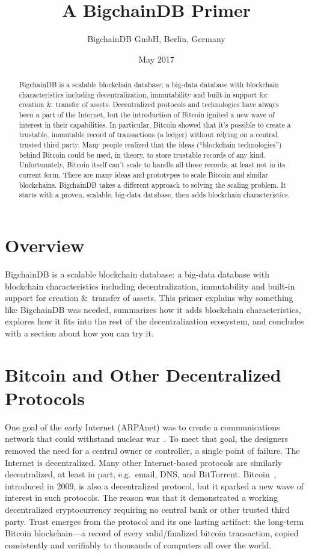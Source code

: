 \documentclass[a4paper]{article}
\title{A BigchainDB Primer}
\author{BigchainDB GmbH, Berlin, Germany}
\date{May 2017}
\begin{document}
\maketitle

\begin{abstract}
BigchainDB is a scalable blockchain database:
a big-data database with blockchain characteristics
including decentralization, immutability and
built-in support for creation \&~transfer of assets.
Decentralized protocols and technologies have always been a part of the Internet,
but the introduction of Bitcoin ignited a new wave of interest in their capabilities.
In particular, Bitcoin showed that it's possible to create a trustable, immutable
record of transactions (a ledger) without relying on a central, trusted third party.
Many people realized that the ideas (``blockchain technologies'') behind Bitcoin
could be used, in theory, to store trustable records of any kind.
Unfortunately, Bitcoin itself can't scale to handle all those records,
at least not in its current form.
There are many ideas and prototypes to scale Bitcoin and similar blockchains.
BigchainDB takes a different approach to solving the scaling problem.
It starts with a proven, scalable, big-data database,
then adds blockchain characteristics.
\end{abstract}


\section{Overview}

BigchainDB is a scalable blockchain database:
a big-data database with blockchain characteristics
including decentralization, immutability and
built-in support for creation \&~transfer of assets.
This primer explains why something like BigchainDB was needed,
summarizes how it adds blockchain characteristics,
explores how it fits into the rest of the decentralization ecosystem,
and concludes with a section about how you can try it.


\section{Bitcoin and Other Decentralized Protocols}

One goal of the early Internet (ARPAnet) was to create a communications network
that could withstand nuclear war~\cite{arpanet_and_nuclear_war}.
To meet that goal, the designers removed the need for a central owner or
controller, a single point of failure. The Internet is decentralized.
Many other Internet-based protocols are similarly decentralized,
at least in part, e.g.~email, DNS, and BitTorrent.
Bitcoin~\cite{nakamoto2009bitcoin}, introduced in 2009,
is also a decentralized protocol,
but it sparked a new wave of interest in such protocols.
The reason was that it demonstrated a working decentralized cryptocurrency
requiring no central bank or other trusted third party.
Trust emerges from the protocol and its one lasting artifact:
the long-term Bitcoin blockchain---a record
of every valid/finalized bitcoin transaction,
copied consistently and verifiably to thousands
of computers all over the world.
\end{document}
